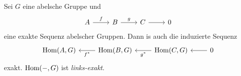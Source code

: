 \setcounter{prop}{3}
\begin{prop}
  Sei $G$ eine abelsche Gruppe und
  \begin{equation*}
    \begin{tikzcd}
      A \arrow{r}{f}  & B
        \arrow{r}{g}  & C
        \arrow{r}{}   & 0
    \end{tikzcd}
  \end{equation*}
  eine exakte Sequenz abelscher Gruppen. Dann is auch die induzierte Sequenz
  \begin{equation*}
    \begin{tikzcd}
      \Hom(A,G) & \Hom(B,G) \arrow{l}{f^*}
                & \Hom(C,G) \arrow{l}{g^*}
                & 0         \arrow{l}{}
    \end{tikzcd}
  \end{equation*}
  exakt. $\mathrm{Hom}(-,G)$ ist \emph{links-exakt}.
\end{prop}
